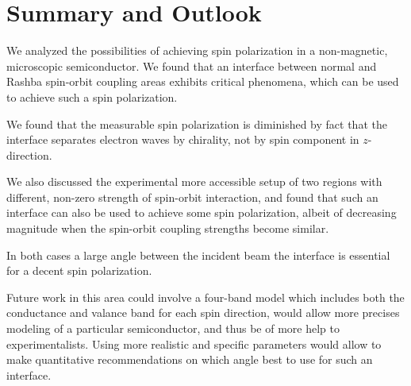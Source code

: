 \chapter{Summary and Outlook}

We analyzed the possibilities of achieving spin polarization in a
non-magnetic, microscopic semiconductor. We found that an interface between
normal and Rashba spin-orbit coupling areas exhibits critical phenomena, which
can be used to achieve such a spin polarization.

We found that the measurable spin polarization is diminished by fact that the
interface separates electron waves by chirality, not by spin component
in $z$-direction.

We also discussed the experimental more accessible setup of two regions with
different, non-zero strength of spin-orbit interaction, and found that such an
interface can also be used to achieve some spin polarization, albeit
of decreasing magnitude when the spin-orbit coupling strengths become similar. 

In both cases a large angle between the incident beam the interface is
essential for a decent spin polarization.


Future work in this area could involve a four-band model which includes both
the conductance and valance band for each spin direction, would
allow more precises modeling of a particular semiconductor, and thus be of
more help to experimentalists. Using more realistic and specific parameters
would allow to make quantitative recommendations on which angle best to use
for such an interface.


